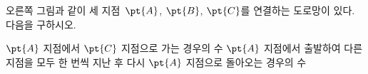 \noindent\begin{minipage}[t]{0.58\linewidth}\vspace{0pt}\raggedright 오른쪽 그림과 같이 세 지점~$\pt{A}$, $\pt{B}$, $\pt{C}$를 연결하는 도로망이 있다. 다음을 구하시오.\end{minipage}\hfill\begin{minipage}[t]{0.4\linewidth}\vspace{0pt}\centering \resizebox{\ifdim\width>\linewidth\linewidth\else\width\fi}{!}{}\end{minipage}\par
{} $\pt{A}$ 지점에서 $\pt{C}$ 지점으로 가는 경우의 수 
 $\pt{A}$ 지점에서 출발하여 다른 지점을 모두 한 번씩 지난 후 다시 $\pt{A}$ 지점으로 돌아오는 경우의 수
